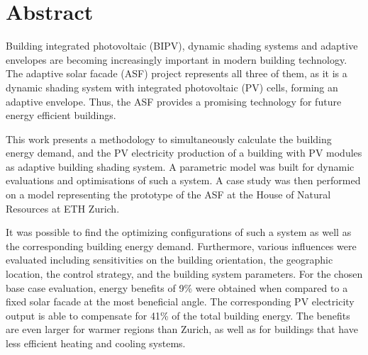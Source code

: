\chapter*{Abstract}
Building integrated photovoltaic (BIPV), dynamic shading systems and adaptive envelopes are becoming increasingly important in modern building technology. The adaptive solar facade (ASF) project represents all three of them, as it is a dynamic shading system with integrated photovoltaic (PV) cells, forming an adaptive envelope. Thus, the ASF provides a promising technology for future energy efficient buildings. 

This work presents a methodology to simultaneously calculate the building energy demand, and the PV electricity production of a building with PV modules as adaptive building shading system. A parametric model was built for dynamic evaluations and optimisations of such a system. A case study was then performed on a model representing the prototype of the ASF at the House of Natural Resources at ETH Zurich. 

It was possible to find the optimizing configurations of such a system as well as the corresponding building energy demand. Furthermore, various influences were evaluated including sensitivities on the building orientation, the geographic location, the control strategy, and the building system parameters. For the chosen base case evaluation, energy benefits of 9\% were obtained when compared to a fixed solar facade at the most beneficial angle. The corresponding PV electricity output is able to compensate for 41\% of the total building energy. The benefits are even larger for warmer regions than Zurich, as well as for buildings that have less efficient heating and cooling systems. 
\newpage